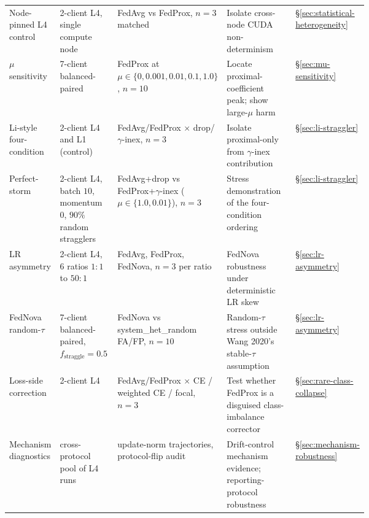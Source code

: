 \documentclass[11pt,a4paper]{report}
\begin{document}
\begin{table}[H]
{\begin{tabular}{l p{0.18\linewidth} p{0.22\linewidth} p{0.28\linewidth} l}
Node-pinned L4 control           & 2-client L4, single compute node             & FedAvg vs FedProx, $n = 3$ matched                       & Isolate cross-node CUDA non-determinism                                       & §\ref{sec:statistical-heterogeneity}            \\
$\mu$ sensitivity                & 7-client balanced-paired                     & FedProx at $\mu \in \{0, 0.001, 0.01, 0.1, 1.0\}$, $n = 10$ & Locate proximal-coefficient peak; show large-$\mu$ harm                      & §\ref{sec:mu-sensitivity}                       \\
Li-style four-condition          & 2-client L4 and L1 (control)                 & FedAvg/FedProx $\times$ drop/$\gamma$-inex, $n = 3$       & Isolate proximal-only from $\gamma$-inex contribution                         & §\ref{sec:li-straggler}                         \\
Perfect-storm                    & 2-client L4, batch $10$, momentum $0$, $90\%$ random stragglers & FedAvg+drop vs FedProx+$\gamma$-inex ($\mu \in \{1.0, 0.01\}$), $n = 3$ & Stress demonstration of the four-condition ordering                        & §\ref{sec:li-straggler}                         \\
LR asymmetry                     & 2-client L4, 6 ratios $1{:}1$ to $50{:}1$    & FedAvg, FedProx, FedNova, $n = 3$ per ratio              & FedNova robustness under deterministic LR skew                                & §\ref{sec:lr-asymmetry}                         \\
FedNova random-$\tau$            & 7-client balanced-paired, $f_{\textrm{straggle}} = 0.5$ & FedNova vs system\_het\_random FA/FP, $n = 10$           & Random-$\tau$ stress outside Wang 2020's stable-$\tau$ assumption             & §\ref{sec:lr-asymmetry}                         \\
Loss-side correction             & 2-client L4                                  & FedAvg/FedProx $\times$ CE / weighted CE / focal, $n = 3$ & Test whether FedProx is a disguised class-imbalance corrector                & §\ref{sec:rare-class-collapse}                  \\
Mechanism diagnostics            & cross-protocol pool of L4 runs               & update-norm trajectories, protocol-flip audit             & Drift-control mechanism evidence; reporting-protocol robustness               & §\ref{sec:mechanism-robustness}                  \\
\bottomrule
\end{tabular}%
}
\end{table}
\end{document}
